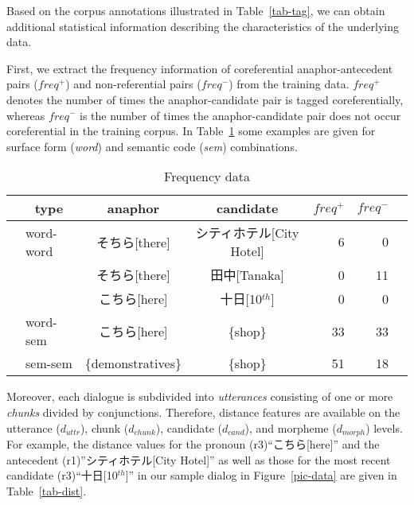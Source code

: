 Based on the corpus annotations illustrated in Table~\ref{tab-tag}, we can obtain additional
statistical information describing the characteristics of the underlying data.

First, we extract the frequency information of coreferential anaphor-antecedent pairs ($freq^+$)
and non-referential pairs ($freq^-$) from the training data.
$freq^+$ denotes the number of times the anaphor-candidate pair is tagged coreferentially,
whereas $freq^-$ is the number of times the anaphor-candidate pair does not occur coreferential
in the training corpus.
In Table~\ref{tab-freq} some examples are given for surface form ({\em word}) and
semantic code ({\em sem}) combinations.

\setlength{\tabcolsep}{2pt}
\begin{table}[hbt]
  \vspace*{-1\baselineskip}
   \begin{center}
   \begin{footnotesize}
    \caption{Frequency data}\label{tab-freq} 
    \vspace*{0.5em}
    \begin{tabular}{|p{0.5em}lccrrp{0.5em}|}
      \hline
      & \multicolumn{1}{c}{type} & anaphor & candidate    & $freq^+$ & $freq^-$   & \\
      \hline \hline
      & word-word & そちら[there]  & シティホテル[City Hotel] &     6    &     0 & \\
      &           & そちら[there]  & 田中[Tanaka]             &     0    &    11 & \\
      &           & こちら[here]   & 十日[10${}^{th}$]               &     0    &     0 & \\
      \hline
      & word-sem  & こちら[here]   & \{shop\}                 &    33    &    33 & \\
      \hline
      & sem-sem   & \{demonstratives\} & \{shop\}             &    51     &   18 & \\
      \hline
    \end{tabular}
   \end{footnotesize}
   \end{center}
   \vspace*{-1\baselineskip}
\end{table}

Moreover, each dialogue is subdivided into {\em utterances} consisting of
one or more {\em chunks} divided by conjunctions.
Therefore, distance features are available on the utterance ($d_{uttr}$), chunk ($d_{chunk}$),
candidate ($d_{cand}$), and morpheme ($d_{morph}$) levels.
For example, the distance values for the pronoun (r3)``こちら[here]'' and
the antecedent (r1)''シティホテル[City Hotel]'' as well as those
for the most recent candidate (r3)``十日[10${}^{th}$]'' in our sample dialog
in Figure~\ref{pic-data} are given in Table~\ref{tab-dist}.

